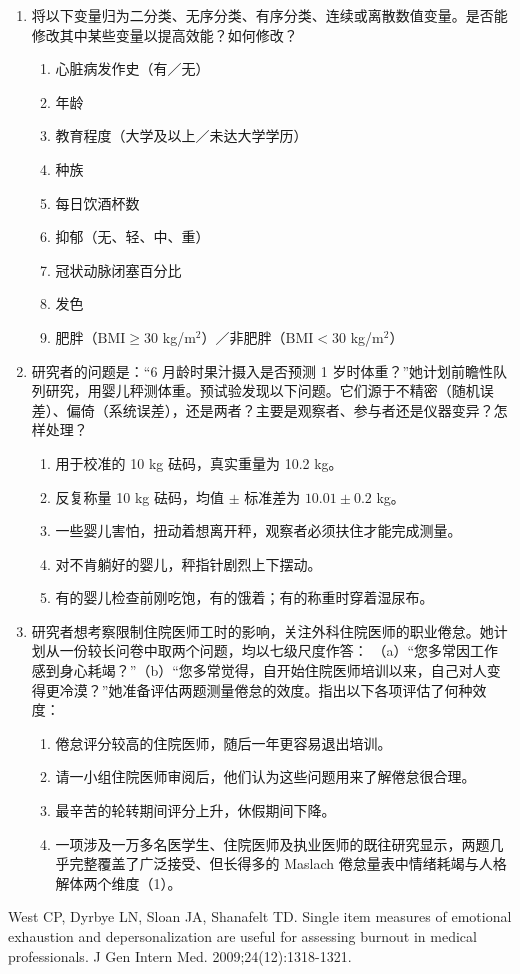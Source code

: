 \begin{enumerate}
\item 将以下变量归为二分类、无序分类、有序分类、连续或离散数值变量。是否能修改其中某些变量以提高效能？如何修改？
\begin{enumerate}
\item 心脏病发作史（有／无）\item 年龄\item 教育程度（大学及以上／未达大学学历）\item 种族\item 每日饮酒杯数\item 抑郁（无、轻、中、重）\item 冠状动脉闭塞百分比\item 发色\item 肥胖（$\mathrm{BMI}\geq30$ kg/m$^2$）／非肥胖（$\mathrm{BMI}<30$ kg/m$^2$）
\end{enumerate}
\item 研究者的问题是：“6 月龄时果汁摄入是否预测 1 岁时体重？”她计划前瞻性队列研究，用婴儿秤测体重。预试验发现以下问题。它们源于不精密（随机误差）、偏倚（系统误差），还是两者？主要是观察者、参与者还是仪器变异？怎样处理？
\begin{enumerate}
\item 用于校准的 10 kg 砝码，真实重量为 10.2 kg。
\item 反复称量 10 kg 砝码，均值 $\pm$ 标准差为 $10.01\pm0.2$ kg。
\item 一些婴儿害怕，扭动着想离开秤，观察者必须扶住才能完成测量。
\item 对不肯躺好的婴儿，秤指针剧烈上下摆动。
\item 有的婴儿检查前刚吃饱，有的饿着；有的称重时穿着湿尿布。
\end{enumerate}
\item 研究者想考察限制住院医师工时的影响，关注外科住院医师的职业倦怠。她计划从一份较长问卷中取两个问题，均以七级尺度作答：
（a）“您多常因工作感到身心耗竭？”（b）“您多常觉得，自开始住院医师培训以来，自己对人变得更冷漠？”她准备评估两题测量倦怠的效度。指出以下各项评估了何种效度：
\begin{enumerate}
\item 倦怠评分较高的住院医师，随后一年更容易退出培训。
\item 请一小组住院医师审阅后，他们认为这些问题用来了解倦怠很合理。
\item 最辛苦的轮转期间评分上升，休假期间下降。
\item 一项涉及一万多名医学生、住院医师及执业医师的既往研究显示，两题几乎完整覆盖了广泛接受、但长得多的 Maslach 倦怠量表中情绪耗竭与人格解体两个维度（1）。
\end{enumerate}
\end{enumerate}
\begin{references}
\item West CP, Dyrbye LN, Sloan JA, Shanafelt TD. Single item measures of emotional exhaustion and depersonalization are useful for assessing burnout in medical professionals. J Gen Intern Med. 2009;24(12):1318-1321.
\end{references}
